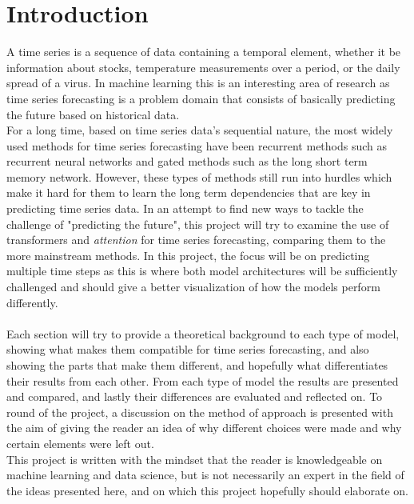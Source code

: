 \documentclass[main.tex]{subfiles}
\begin{document}
\section{Introduction}

A time series is a sequence of data containing a temporal element, whether it be information about stocks, temperature measurements over a period, or the daily spread of a virus. In machine learning this is an interesting area of research as time series forecasting is a problem domain that consists of basically predicting the future based on historical data.\\
For a long time, based on time series data's sequential nature, the most widely used methods for time series forecasting have been recurrent methods such as recurrent neural networks and gated methods such as the long short term memory network. However, these types of methods still run into hurdles which make it hard for them to learn the long term dependencies that are key in predicting time series data. In an attempt to find new ways to tackle the challenge of "predicting the future", this project will try to examine the use of transformers and \textit{attention} for time series forecasting, comparing them to the more mainstream methods. In this project, the focus will be on predicting multiple time steps as this is where both model architectures will be sufficiently challenged and should give a better visualization of how the models perform differently. \\
\\
Each section will try to provide a theoretical background to each type of model, showing what makes them compatible for time series forecasting, and also showing the parts that make them different, and hopefully what differentiates their results from each other. From each type of model the results are presented and compared, and lastly their differences are evaluated and reflected on. To round of the project, a discussion on the method of approach is presented with the aim of giving the reader an idea of why different choices were made and why certain elements were left out.\\
This project is written with the mindset that the reader is knowledgeable on machine learning and data science, but is not necessarily an expert in the field of the ideas presented here, and on which this project hopefully should elaborate on.
\end{document}
